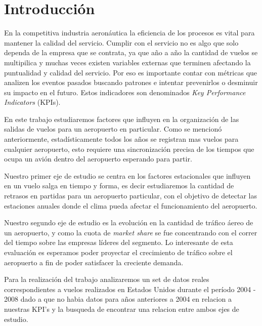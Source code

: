 \documentclass{endm}
\begin{document}
\section{Introducci\'on}\label{intro}


En la competitiva industria aeron\'autica la eficiencia de los procesos es vital para mantener la calidad del servicio. Cumplir con el servicio no es algo que solo dependa de la empresa que se contrata, ya que a\~no a a\~no la cantidad de vuelos se multipilica y muchas veces existen variables externas que terminen afectando la puntualidad y calidad del servicio. Por eso es importante contar con m\'etricas que analizen los eventos pasados buscando patrones e intentar prevenirlos o desminuir su impacto en el futuro. Estos indicadores son denominados \textit{Key Performance Indicators} (KPIs).

En este trabajo estudiaremos factores que influyen en la organizaci\'on de las salidas de vuelos para un aeropuerto en particular. Como se mencion\'o anteriormente, estad\'isticamente todos los a\~nos se registran mas vuelos para cualquier aeropuerto, esto requiere una sincronizaci\'on precisa de los tiempos que ocupa un avi\'on dentro del aeropuerto esperando para partir.

Nuestro primer eje de estudio se centra en los factores estacionales que influyen en un vuelo salga en tiempo y forma, es decir estudiaremos la cantidad de retrasos en partidas para un aeropuerto particular, con el objetivo de detectar las estaciones anuales donde el clima pueda afectar el funcionamiento del aeropuerto.

Nuestro segundo eje de estudio es la evoluci\'on en la cantidad de tr\'afico \'aereo de un aeropuerto, y como la cuota de \textit{market share} se fue concentrando con el correr del tiempo sobre las empresas l\'ideres del segmento. Lo interesante de esta evaluaci\'on es esperamos poder proyectar el crecimiento de tr\'afico sobre el aeropuerto a fin de poder satisfacer la creciente demanda.

Para la realización del trabajo analizaremos un set de datos reales correspondientes a vuelos realizados en Estados Unidos durante el per\'iodo 2004 - 2008 dado a que no habia datos para años anteriores a 2004 en relacion a nuestras KPI's y la busqueda de encontrar una relacion entre ambos ejes de estudio.
\end{document}
